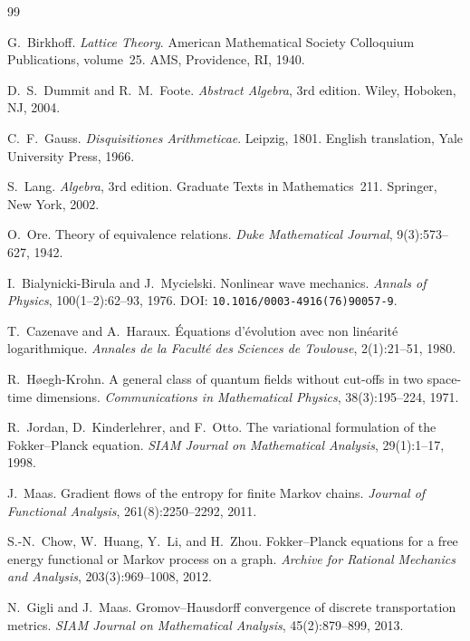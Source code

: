 \documentclass[11pt,reqno]{amsart}
\theoremstyle{plain}
\theoremstyle{definition}
\theoremstyle{remark}
\begin{document}
\begin{thebibliography}{99}

G.~Birkhoff.
\newblock \emph{Lattice Theory}.
\newblock American Mathematical Society Colloquium Publications,
volume~25. AMS, Providence, RI, 1940.

D.~S.~Dummit and R.~M.~Foote.
\newblock \emph{Abstract Algebra}, 3rd edition.
\newblock Wiley, Hoboken, NJ, 2004.

C.~F.~Gauss.
\newblock \emph{Disquisitiones Arithmeticae}.
\newblock Leipzig, 1801.
\newblock English translation, Yale University Press, 1966.

S.~Lang.
\newblock \emph{Algebra}, 3rd edition.
\newblock Graduate Texts in Mathematics~211. Springer, New York, 2002.

O.~Ore.
\newblock Theory of equivalence relations.
\newblock \emph{Duke Mathematical Journal}, 9(3):573--627, 1942.

I.~Bialynicki-Birula and J.~Mycielski.
\newblock Nonlinear wave mechanics.
\newblock \emph{Annals of Physics}, 100(1--2):62--93, 1976.
\newblock DOI: \texttt{10.1016/0003-4916(76)90057-9}.

T.~Cazenave and A.~Haraux.
\newblock \'Equations d'\'evolution avec non lin\'earit\'e logarithmique.
\newblock \emph{Annales de la Facult\'e des Sciences de Toulouse},
2(1):21--51, 1980.

R.~H{\o}egh-Krohn.
\newblock A general class of quantum fields without cut-offs in two
space-time dimensions.
\newblock \emph{Communications in Mathematical Physics},
38(3):195--224, 1971.

R.~Jordan, D.~Kinderlehrer, and F.~Otto.
\newblock The variational formulation of the Fokker--Planck equation.
\newblock \emph{SIAM Journal on Mathematical Analysis},
29(1):1--17, 1998.

J.~Maas.
\newblock Gradient flows of the entropy for finite Markov chains.
\newblock \emph{Journal of Functional Analysis},
261(8):2250--2292, 2011.

S.-N.~Chow, W.~Huang, Y.~Li, and H.~Zhou.
\newblock Fokker--Planck equations for a free energy functional or
Markov process on a graph.
\newblock \emph{Archive for Rational Mechanics and Analysis},
203(3):969--1008, 2012.

N.~Gigli and J.~Maas.
\newblock Gromov--Hausdorff convergence of discrete transportation
metrics.
\newblock \emph{SIAM Journal on Mathematical Analysis},
45(2):879--899, 2013.

\end{thebibliography}
\end{document}
